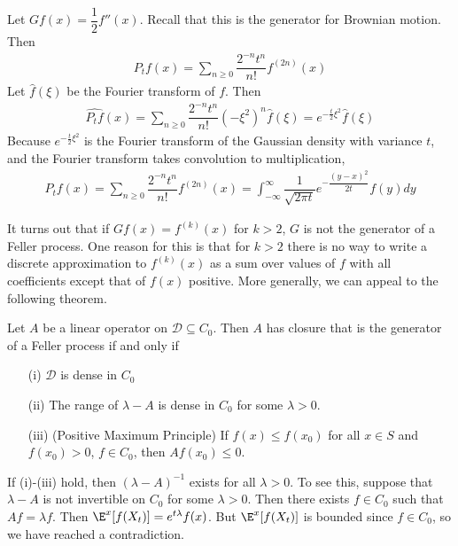 \begin{exmp}
Let $Gf(x) = \dfrac{1}{2} f''(x)$. Recall that this is the generator for Brownian motion. 
Then 
$$\begin{aligned}
P_t f(x) =  \sum_{n \geq 0} \dfrac{2^{-n}t^{n}}{n!} f^{(2n)}(x) 
\end{aligned}$$
Let $\widehat{f}(\xi)$ be the Fourier transform of $f$. Then
$$\begin{aligned}
\widehat{P_t f}(x) =  \sum_{n \geq 0} \dfrac{2^{-n}t^{n}}{n!} (-\xi^2)^{n} \hat{f}(\xi) = e^{-\frac{t}{2} \xi^2} \widehat{f}(\xi)
\end{aligned}$$
Because $e^{-\frac{t}{2} \xi^2}$ is the Fourier transform of the Gaussian density with variance $t$, and the Fourier transform takes convolution to multiplication,
$$\begin{aligned}
P_t f(x) =  \sum_{n \geq 0} \dfrac{2^{-n}t^{n}}{n!} f^{(2n)}(x) 
= 
\int_{-\infty}^{\infty} \dfrac{1}{\sqrt{ 2 \pi t }} e^{-\dfrac{ (y-x)^2}{2t}} f(y) dy
\end{aligned}$$
\end{exmp}

It turns out that if $Gf(x) = f^{(k)}(x)$ for $k > 2$, $G$ is not the generator of a Feller process.
One reason for this is that for $k > 2$ there is no way to write a discrete approximation to $f^{(k)}(x)$ as a sum over values of $f$ with all coefficients except that of $f(x)$ positive. More generally, we can appeal to the following theorem.

\begin{thm}
Let $A$ be a linear operator on $\mathcal{D} \subseteq C_0$.
Then $A$ has closure that is the generator of a Feller process if and only if
\begin{enumerate}
\item[(i)] $\mathcal{D}$ is dense in $C_0$
\item[(ii)] The range of $\lambda - A$ is dense in $C_0$ for some $\lambda > 0$. 
\item[(iii)] (Positive Maximum Principle) If $f(x) \leq f(x_0)$ for all $x \in S$ and $f(x_0) > 0$, $f \in C_0$, then $A f(x_0) \leq 0$.
\end{enumerate}
\end{thm}

\begin{note}
If (i)-(iii) hold, then $(\lambda - A)^{-1}$ exists for all $\lambda > 0$. To see this, suppose that $\lambda - A$ is not invertible on $C_0$ for some $\lambda > 0$. 
Then there exists $f \in C_0$ such that $Af = \lambda f$. Then $\E^x[f(X_t)] =e^{t \lambda} f(x)$. But $\E^x[f(X_t)]$ is bounded since $f \in C_0$, so we have reached a contradiction. 
\end{note}

